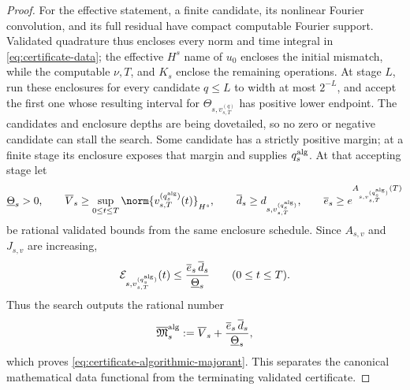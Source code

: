 \begin{proof}
For the effective statement, a finite candidate, its nonlinear Fourier
convolution, and its full residual have compact computable Fourier support.
Validated quadrature thus encloses every norm and time integral in
\eqref{eq:certificate-data}; the effective \(H^s\) name of \(u_0\) encloses
the initial mismatch, while the computable \(\nu,T\), and \(K_s\) enclose the
remaining operations.  At stage \(L\), run these enclosures for every
candidate \(q\le L\) to width at most \(2^{-L}\), and accept the first one
whose resulting interval for \(\Theta_{s,v_{s,T}^{(q)}}\) has positive lower
endpoint.  The candidates and enclosure depths are being dovetailed, so no
zero or negative candidate can stall the search.  Some candidate has a
strictly positive margin; at a finite stage its enclosure exposes that margin
and supplies \(q_s^{\rm alg}\).  At that accepting stage let
\[
 \underline\Theta_s>0,
 \qquad
 \overline V_s\ge
 \sup_{0\le t\le T}\norm{v_{s,T}^{(q_s^{\rm alg})}(t)}_{H^s},
 \qquad
 \overline d_s\ge d_{s,v_{s,T}^{(q_s^{\rm alg})}},
 \qquad
 \overline e_s\ge e^{A_{s,v_{s,T}^{(q_s^{\rm alg})}}(T)}
\]
be rational validated bounds from the same enclosure schedule.  Since
\(A_{s,v}\) and \(J_{s,v}\) are increasing,
\[
 \mathcal E_{s,v_{s,T}^{(q_s^{\rm alg})}}(t)
 \le \frac{\overline e_s\,\overline d_s}{\underline\Theta_s}
 \qquad(0\le t\le T).
\]
Thus the search outputs the rational number
\begin{equation}
 \overline{\mathfrak M}_s^{\rm alg}
 :=\overline V_s+
 \frac{\overline e_s\,\overline d_s}{\underline\Theta_s},
 \label{eq:certificate-rational-output}
\end{equation}
which proves \eqref{eq:certificate-algorithmic-majorant}.  This separates the
canonical mathematical data functional from the terminating validated
certificate.
\end{proof}

